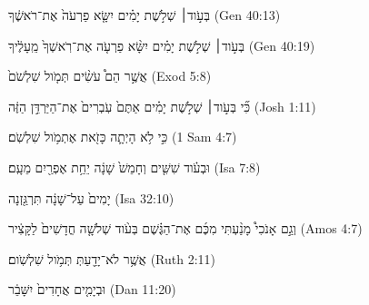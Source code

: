 
\begin{exe}

\ex\label{distpastfut_exs1}
\texthebrew{
בְּעֹ֣וד׀ שְׁלֹ֣שֶׁת יָמִ֗ים יִשָּׂ֤א פַרְעֹה֙ אֶת־רֹאשֶׁ֔ךָ 
} (Gen 40:13)

\ex\label{distpastfut_exs2}
\texthebrew{
בְּעֹ֣וד׀ שְׁלֹ֣שֶׁת יָמִ֗ים יִשָּׂ֨א פַרְעֹ֤ה אֶת־רֹֽאשְׁךָ֙ מֵֽעָלֶ֔יךָ 
} (Gen 40:19)

\ex\label{distpastfut_exs3}
\texthebrew{
אֲשֶׁ֣ר הֵם֩ עֹשִׂ֨ים תְּמֹ֤ול שִׁלְשֹׁם֙ 
} (Exod 5:8)

\ex\label{distpastfut_exs4}
\texthebrew{
כִּ֞י בְּעֹ֣וד׀ שְׁלֹ֣שֶׁת יָמִ֗ים אַתֶּם֙ עֹֽבְרִים֙ אֶת־הַיַּרְדֵּ֣ן הַזֶּ֔ה 
} (Josh 1:11)

\ex\label{distpastfut_exs5}
\texthebrew{
כִּ֣י לֹ֥א הָיְתָ֛ה כָּזֹ֖את אֶתְמֹ֥ול שִׁלְשֹֽׁם׃ 
} (1 Sam 4:7)

\ex\label{distpastfut_exs6}
\texthebrew{
וּבְעֹ֗וד שִׁשִּׁ֤ים וְחָמֵשׁ֙ שָׁנָ֔ה יֵחַ֥ת אֶפְרַ֖יִם מֵעָֽם׃ 
} (Isa 7:8)

\ex\label{distpastfut_exs7}
\texthebrew{
יָמִים֙ עַל־שָׁנָ֔ה תִּרְגַּ֖זְנָה 
} (Isa 32:10)

\ex\label{distpastfut_exs8}
\texthebrew{
וְגַ֣ם אָנֹכִי֩ מָנַ֨עְתִּי מִכֶּ֜ם אֶת־הַגֶּ֗שֶׁם בְּעֹ֨וד שְׁלֹשָׁ֤ה חֳדָשִׁים֙ לַקָּצִ֔יר 
} (Amos 4:7)

\ex\label{distpastfut_exs9}
\texthebrew{
אֲשֶׁ֥ר לֹא־יָדַ֖עַתְּ תְּמֹ֥ול שִׁלְשֹֽׁום׃ 
} (Ruth 2:11)

\ex\label{distpastfut_exs10}
\texthebrew{
וּבְיָמִ֤ים אֲחָדִים֙ יִשָּׁבֵ֔ר 
} (Dan 11:20)

\end{exe}
